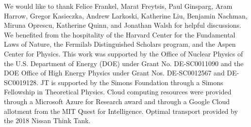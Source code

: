 \documentclass[aps,prl,twocolumn,preprintnumbers,nofootinbib,longbibliography,floatfix]{revtex4-1}
\begin{document}
\begin{acknowledgments}

We would like to thank Felice Frankel, Marat Freytsis, Paul Ginsparg, Aram Harrow, Gregor Kasieczka, Andrew Larkoski, Katherine Liu, Benjamin Nachman, Miruna Oprescu, Katherine Quinn, and Jonathan Walsh for helpful discussions.
%
We benefited from the hospitality of the Harvard Center for the Fundamental Laws of Nature, the Fermilab Distinguished Scholars program, and the Aspen Center for Physics.
%
This work was supported by the Office of Nuclear Physics of the U.S. Department of Energy (DOE) under Grant No. DE-SC0011090 and the DOE Office of High Energy Physics under Grant Nos. DE-SC0012567 and DE-SC0019128.
%
JT is supported by the Simons Foundation through a Simons Fellowship in Theoretical Physics.
%
Cloud computing resources were provided through a Microsoft Azure for Research award and through a Google Cloud allotment from the MIT Quest for Intelligence.
%
Optimal transport provided by the 2018 Nissan Think Tank.

\end{acknowledgments}


\end{document}
